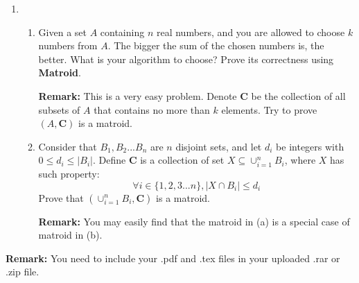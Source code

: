 \documentclass[12pt,a4paper]{article}
\theoremstyle{definition}
\begin{document}
\begin{enumerate}
    \item
\begin{enumerate}
\item
    Given a set $A$ containing $n$ real numbers, and you are allowed to choose $k$ numbers from $A$. The bigger the sum of the chosen numbers is, the better. What is your algorithm to choose? Prove its correctness using \textbf{Matroid}.\par
\textbf{Remark:} This is a very easy problem. Denote $\mathbf{C}$ be the collection of all subsets of $A$ that contains no more than $k$ elements. Try to prove $(A,\mathbf{C})$ is a matroid.\par
\item
Consider that $B_1,B_2 ... B_n$ are $n$ disjoint sets, and let $d_i$ be integers with $0\leq d_{i}\leq |B_{i}|$. Define $\mathbf{C}$ is a collection of set $X\subseteq \cup^{n}_{i=1} B_i$, where $X$ has such property:
$$\forall i\in \{1,2,3 ... n\},  |X\cap B_{i}|\leq d_{i}$$
Prove that $(\cup^{n}_{i=1} B_i,\mathbf{C})$ is a matroid.\par
\textbf{Remark:} You may easily find that the matroid in (a) is a special case of matroid in (b).


\end{enumerate}
  

    

\end{enumerate}

\vspace{20pt}

\textbf{Remark:} You need to include your .pdf and .tex files in your uploaded .rar or .zip file.

\end{document}

